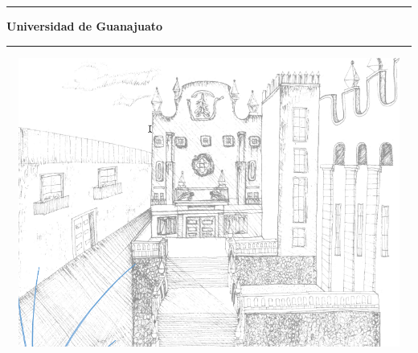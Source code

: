 \documentclass[twocolumn,12pt]{article}
\newcommand{\espacio}[1]{\vspace*{#1\baselineskip}}
\begin{document}
	\begin{titlepage}
	\begin{center}
	    \espacio{1}
		\hrule height 3pt
		\espacio{1}
		{\Huge \textbf{Universidad de Guanajuato}}\\[0.1cm]
	
		\espacio{0.5}
		\hrule 
	   
		\espacio{4}
		\includegraphics[width=18.0cm,height=9.5cm]{Imagenes/2}
		\vspace{1.6cm}
	    \end{center}

\end{titlepage}
\end{document}
